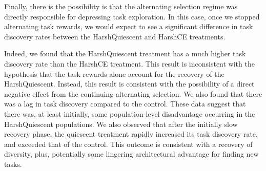 \documentclass[10pt,letterpaper,final]{article}
\begin{document}
Finally, there is the possibility is that the alternating selection regime was directly responsible for depressing task exploration. In this case, once we stopped alternating task rewards, we would expect to see a significant difference in task discovery rates between the HarshQuiescent and HarshCE treatments. 

Indeed, we found that the HarshQuiescent treatment has a much higher task discovery rate than the HarshCE treatment. This result is inconsistent with the hypothesis that the task rewards alone account for the recovery of the HarshQuiescent. Instead, this result is consistent with the possibility of a direct negative effect from the continuing alternating selection. We also found that there was a lag in task discovery compared to the control. These data suggest that there was, at least initially, some population-level disadvantage occurring in the HarshQuiescent populations. We also observed that after the initially slow recovery phase, the quiescent treatment rapidly increased its task discovery rate, and exceeded that of the control. This outcome is consistent with a recovery of diversity, plus, potentially some lingering architectural advantage for finding new tasks.
\end{document}
